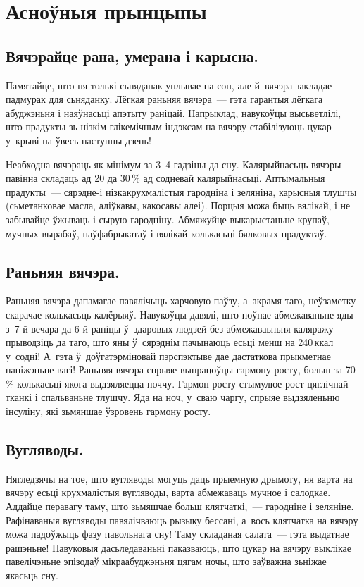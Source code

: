 \section{Асноўныя прынцыпы}

\subsection{Вячэрайце рана, умерана і карысна.}
Памятайце, што ня толькі сьняданак уплывае на сон, але й~вячэра закладае падмурак для сьняданку. Лёгкая раньняя вячэра~--- гэта гарантыя лёгкага абуджэньня і наяўнасьці апэтыту раніцай. Напрыклад, навукоўцы высьветлілі, што прадукты зь нізкім глікемічным індэксам на вячэру стабілізуюць цукар у~крыві на ўвесь наступны дзень!

Неабходна вячэраць як мінімум за 3--4 гадзіны да сну. Калярыйнасьць вячэры павінна складаць ад 20 да 30\,\% ад содневай калярыйнасьці. Аптымальныя прадукты~--- сярэдне-і нізкакрухмалістыя гародніна і зеляніна, карысныя тлушчы (сьметанковае масла, аліўкавы, какосавы алеі). Порцыя можа быць вялікай, і не забывайце ўжываць і сырую гародніну. Абмяжуйце выкарыстаньне крупаў, мучных вырабаў, паўфабрыкатаў і вялікай колькасьці бялковых прадуктаў.


\subsection{Раньняя вячэра.}
Раньняя вячэра дапамагае павялічыць харчовую паўзу, а~акрамя таго, неўзаметку скарачае колькасьць калёрыяў. Навукоўцы давялі, што поўнае абмежаваньне яды з~7-й вечара да 6-й раніцы ў~здаровых людзей без абмежаваьньня каляражу прыводзіць да таго, што яны ў~сярэднім пачынаюць есьці менш на 240\,ккал у~содні! А~гэта ў~доўгатэрміновай пэрспэктыве дае дастаткова прыкметнае паніжэньне вагі! Раньняя вячэра спрыяе выпрацоўцы гармону росту, больш за 70\,\% колькасьці якога выдзяляецца ноччу. Гармон росту стымулюе рост цяглічнай тканкі і спальваньне тлушчу. Яда на ноч, у~сваю чаргу, спрыяе выдзяленьню інсуліну, які зьмяншае ўзровень гармону росту.

\subsection{Вугляводы.}
Нягледзячы на тое, што вугляводы могуць даць прыемную дрымоту, ня варта на вячэру есьці крухмалістыя вугляводы, варта абмежаваць мучное і салодкае. Аддайце перавагу таму, што зьмяшчае больш клятчаткі,~--- гародніне і зеляніне. Рафінаваныя вугляводы павялічваюць рызыку бессані, а~вось клятчатка на вячэру можа падоўжыць фазу павольнага сну! Таму складаная салата~--- гэта выдатнае рашэньне! Навуковыя дасьледаваньні паказваюць, што цукар на вячэру выклікае павелічэньне эпізодаў мікраабуджэньня цягам ночы, што заўважна зьніжае якасьць сну.

